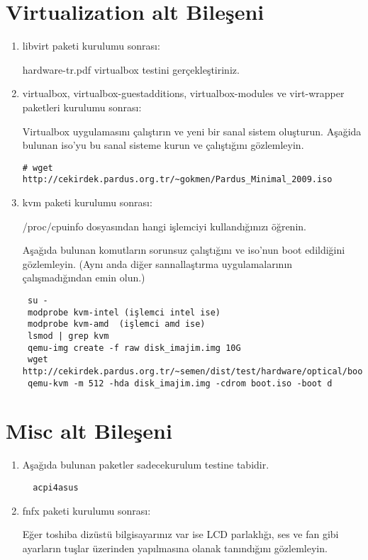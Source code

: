 \documentclass[a4paper,10pt]{article}
\begin{document}
\section{Virtualization alt Bileşeni}
\begin{enumerate}
 \item libvirt paketi kurulumu sonrası:

hardware-tr.pdf virtualbox testini gerçekleştiriniz.
 \item virtualbox, virtualbox-guestadditions, virtualbox-modules ve virt-wrapper paketleri kurulumu sonrası:
 
Virtualbox uygulamasını çalıştırın ve yeni bir sanal sistem oluşturun. Aşağida bulunan iso'yu bu sanal sisteme kurun ve çalıştığını gözlemleyin.
\begin{verbatim}
# wget http://cekirdek.pardus.org.tr/~gokmen/Pardus_Minimal_2009.iso
\end{verbatim}
 \item kvm paketi kurulumu sonrası:

/proc/cpuinfo dosyasından hangi işlemciyi kullandığınızı öğrenin.

Aşağıda bulunan komutların sorunsuz çalıştığını ve iso'nun boot edildiğini gözlemleyin. (Aynı anda diğer sannallaştırma uygulamalarının çalışmadığından emin olun.)
\begin{verbatim}
 su -
 modprobe kvm-intel (işlemci intel ise)
 modprobe kvm-amd  (işlemci amd ise)
 lsmod | grep kvm 
 qemu-img create -f raw disk_imajim.img 10G 
 wget http://cekirdek.pardus.org.tr/~semen/dist/test/hardware/optical/boot.iso
 qemu-kvm -m 512 -hda disk_imajim.img -cdrom boot.iso -boot d 
\end{verbatim}



\end{enumerate}

\section{Misc alt Bileşeni}
\begin{enumerate}
 \item Aşağıda bulunan paketler sadecekurulum testine tabidir.
\begin{verbatim}
  acpi4asus
\end{verbatim}

\item fnfx paketi kurulumu sonrası:

Eğer toshiba dizüstü bilgisayarınız var ise LCD parlaklığı, ses ve fan gibi ayarların tuşlar üzerinden yapılmasına olanak tanındığını gözlemleyin.
\end{enumerate}
\end{document}
